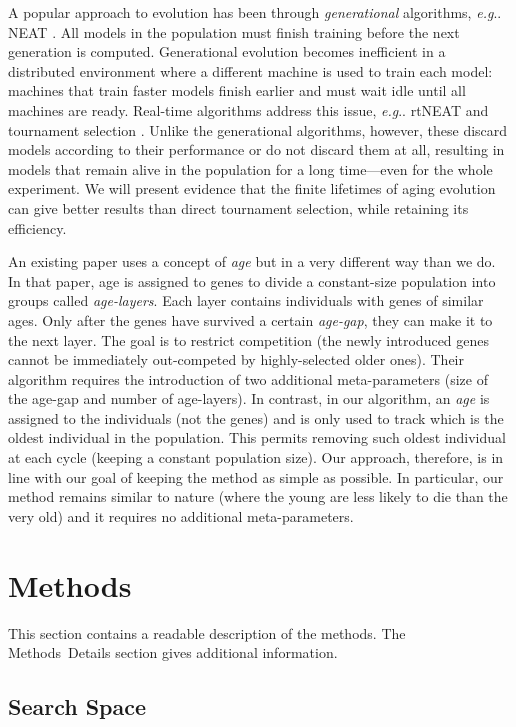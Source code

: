 \documentclass[letterpaper]{article} \usepackage{aaai19}  \usepackage{times}  \usepackage{helvet}  \usepackage{courier}  \usepackage{graphicx}  \frenchspacing
\makeatletter
\DeclareRobustCommand\onedot{\futurelet\@let@token\@onedot}
\def\@onedot{\ifx\@let@token.\else.\null\fi\xspace}
\def\eg{\emph{e.g}\onedot}
\makeatother
\begin{document}
A popular approach to evolution has been through \textit{generational} algorithms, \eg NEAT \cite{stanley2002evolving}. All models in the population must finish training before the next generation is computed. Generational evolution becomes inefficient in a distributed environment where a different machine is used to train each model: machines that train faster models finish earlier and must wait idle until all machines are ready. Real-time algorithms address this issue, \eg rtNEAT \cite{stanley2005real} and tournament selection \cite{goldberg1991comparative}. Unlike the generational algorithms, however, these discard models according to their performance or do not discard them at all, resulting in models that remain alive in the population for a long time---even for the whole experiment. We will present evidence that the finite lifetimes of aging evolution can give better results than direct tournament selection, while retaining its efficiency.

An existing paper \cite{hornby2006alps} uses a concept of \textit{age} but in a very different way than we do. In that paper, age is assigned to genes to divide a constant-size population into groups called \textit{age-layers}. Each layer contains individuals with genes of similar ages. Only after the genes have survived a certain \textit{age-gap}, they can make it to the next layer. The goal is to restrict competition (the newly introduced genes cannot be immediately out-competed by highly-selected older ones). Their algorithm requires the introduction of two additional meta-parameters (size of the age-gap and number of age-layers). In contrast, in our algorithm, an \textit{age} is assigned to the individuals (not the genes) and is only used to track which is the oldest individual in the population. This permits removing such oldest individual at each cycle (keeping a constant population size). Our approach, therefore, is in line with our goal of keeping the method as simple as possible. In particular, our method remains similar to nature (where the young are less likely to die than the very old) and it requires no additional meta-parameters.


\section{Methods}


This section contains a readable description of the methods. The Methods~Details section gives additional information.


\subsection{Search Space}
\end{document}
